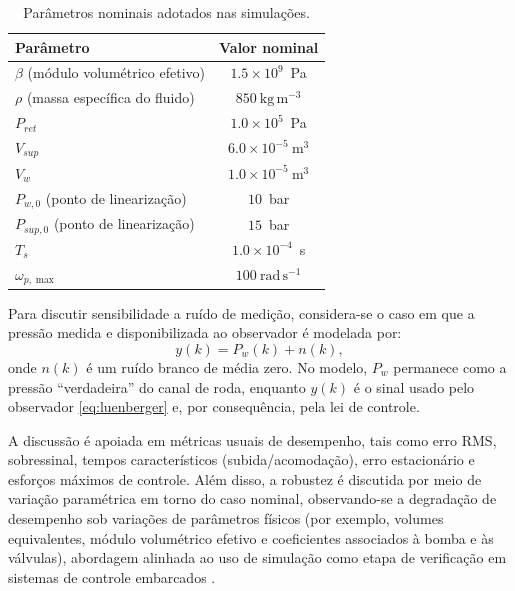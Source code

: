 \documentclass[a4paper]{ifacconf}
\begin{document}
\begin{table}[t]
   \centering
   \caption{Parâmetros nominais adotados nas simulações.}
   \label{tab:parametros_simulacao}
   \begin{tabular}{lc}
      \toprule
      Parâmetro                            & Valor nominal                    \\
      \midrule
      $\beta$ (módulo volumétrico efetivo) & $1.5\times 10^{9}$~Pa            \\
      $\rho$ (massa específica do fluido)  & $850~\mathrm{kg\,m^{-3}}$        \\
      $P_{ret}$                            & $1.0\times 10^{5}$~Pa            \\
      $V_{sup}$                            & $6.0\times 10^{-5}~\mathrm{m^3}$ \\
      $V_w$                                & $1.0\times 10^{-5}~\mathrm{m^3}$ \\
      $P_{w,0}$ (ponto de linearização)    & $10$~bar                         \\
      $P_{sup,0}$ (ponto de linearização)  & $15$~bar                         \\
      $T_s$                                & $1.0\times 10^{-4}$~s            \\
      $\omega_{p,\max}$                    & $100~\mathrm{rad\,s^{-1}}$       \\
      \bottomrule
   \end{tabular}
\end{table}

Para discutir sensibilidade a ruído de medição, considera-se o caso em que a pressão medida e disponibilizada ao observador é modelada por:
\begin{equation}
   y(k)=P_w(k)+n(k),
   \label{eq:meas_noise_model}
\end{equation}
onde $n(k)$ é um ruído branco de média zero. No modelo, $P_w$ permanece como a pressão ``verdadeira'' do canal de roda, enquanto $y(k)$ é o sinal usado pelo observador \eqref{eq:luenberger} e, por consequência, pela lei de controle.

A discussão é apoiada em métricas usuais de desempenho, tais como erro RMS, sobressinal, tempos característicos (subida/acomodação), erro estacionário e esforços máximos de controle. Além disso, a robustez é discutida por meio de variação paramétrica em torno do caso nominal, observando-se a degradação de desempenho sob variações de parâmetros físicos (por exemplo, volumes equivalentes, módulo volumétrico efetivo e coeficientes associados à bomba e às válvulas), abordagem alinhada ao uso de simulação como etapa de verificação em sistemas de controle embarcados \cite{KapinskiJamesDeshmukh2016}.
\end{document}
